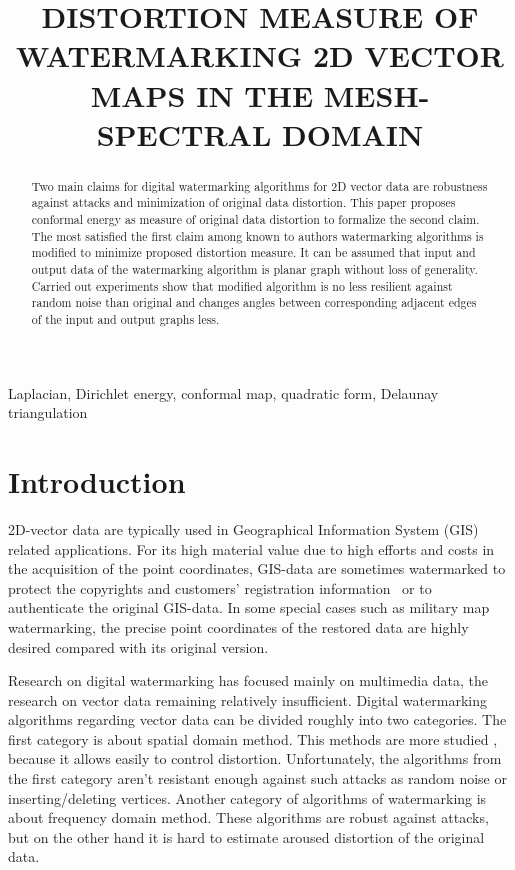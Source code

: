 \documentclass{article}
\title{DISTORTION MEASURE OF WATERMARKING 2D VECTOR MAPS IN THE MESH-SPECTRAL DOMAIN}
\begin{document}
%
\maketitle
%
\begin{abstract}
Two main claims for digital watermarking algorithms for 2D vector data are robustness against attacks and minimization of original data distortion. 
This paper proposes conformal energy as measure of original data distortion to formalize the second claim. The most satisfied the first claim among known to authors watermarking algorithms is modified 
to minimize proposed distortion measure. It can be assumed that input and output data of the watermarking algorithm is planar graph without loss of generality. 
Carried out experiments show that modified algorithm is no less resilient against random noise than original and changes angles between corresponding adjacent edges of the input and output graphs less.
\end{abstract}
%
\begin{keywords}
Laplacian, Dirichlet energy, conformal map, quadratic form, Delaunay triangulation
\end{keywords}
%
\section{Introduction}
\label{sec:intro}
2D-vector data are typically used in Geographical Information System (GIS) related applications. For its high material value due to high efforts and costs in the acquisition of the point coordinates, 
GIS-data are sometimes watermarked to protect the copyrights and customers’ registration information~\cite{Voight} or to authenticate the original GIS-data. In some special cases such as military map watermarking, 
the precise point coordinates of the restored data are highly desired compared with its original version.  

Research on digital watermarking has focused mainly on multimedia data, the research on vector data remaining relatively insufficient. 
Digital watermarking algorithms regarding vector data can be divided roughly into two categories. The first category is about spatial domain method. This methods are more studied \cite{Voight, Kim, Chang, Bazin}, 
because it allows easily to control distortion. Unfortunately, the algorithms from the first category aren't resistant enough against such attacks as random noise or inserting/deleting vertices.
Another category of algorithms of watermarking is about frequency domain method. These algorithms \cite{Ohbuchi, Ohbuchi3D, Praun} are robust against attacks, 
but on the other hand it is hard to estimate aroused distortion of the original data.
 
\end{document}
